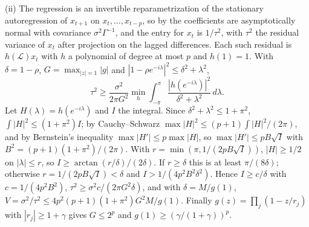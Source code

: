 \documentclass[12pt]{article}
\theoremstyle{definition}
\theoremstyle{remark}
\begin{document}
(ii) The regression is an invertible reparametrization of the stationary autoregression of $x_{t+1}$ on $x_t,\dots,x_{t-p}$, so by \citet{mannwald1943} the coefficients are asymptotically normal with covariance $\sigma^2\Gamma^{-1}$, and the entry for $x_t$ is $1/\tau^2$, with $\tau^2$ the residual variance of $x_t$ after projection on the lagged differences. Each such residual is $h(\mathcal L)x_t$ with $h$ a polynomial of degree at most $p$ and $h(1)=1$. With $\delta=1-\rho$, $G=\max_{|z|=1}|g|$ and $|1-\rho e^{-i\lambda}|^2\le\delta^2+\lambda^2$,
\[
\tau^2\ge\frac{\sigma^2}{2\pi G^2}\min_h\int_{-\pi}^{\pi}\frac{|h(e^{-i\lambda})|^2}{\delta^2+\lambda^2}\,d\lambda .
\]
Let $H(\lambda)=h(e^{-i\lambda})$ and $I$ the integral. Since $\delta^2+\lambda^2\le1+\pi^2$, $\int|H|^2\le(1+\pi^2)I$; by Cauchy--Schwarz $\max|H|^2\le(p+1)\int|H|^2/(2\pi)$, and by Bernstein's inequality $\max|H'|\le p\max|H|$, so $\max|H'|\le pB\sqrt I$ with $B^2=(p+1)(1+\pi^2)/(2\pi)$. With $r=\min(\pi,1/(2pB\sqrt I))$, $|H|\ge1/2$ on $|\lambda|\le r$, so $I\ge\arctan(r/\delta)/(2\delta)$. If $r\ge\delta$ this is at least $\pi/(8\delta)$; otherwise $r=1/(2pB\sqrt I)<\delta$ and $I>1/(4p^2B^2\delta^2)$. Hence $I\ge c/\delta$ with $c=1/(4p^2B^2)$, $\tau^2\ge\sigma^2c/(2\pi G^2\delta)$, and with $\delta=M/g(1)$, $V=\sigma^2/\tau^2\le4p^2(p+1)(1+\pi^2)G^2M/g(1)$. Finally $g(z)=\prod_j(1-z/r_j)$ with $|r_j|\ge1+\gamma$ gives $G\le2^p$ and $g(1)\ge(\gamma/(1+\gamma))^p$.
\end{document}
